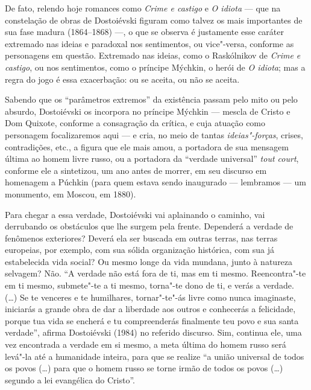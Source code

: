 De fato, relendo hoje romances como \emph{Crime e castigo}
e \emph{O idiota} --- que na constelação de
obras de Dostoiévski figuram como talvez os mais importantes
de sua fase madura (1864--1868) ---, o que se observa é
justamente esse caráter extremado nas ideias e paradoxal
nos sentimentos, ou vice"-versa, conforme as personagens em
questão. Extremado nas ideias, como o Raskólnikov de
\emph{Crime e castigo}, ou nos sentimentos, como o príncipe
Mýchkin, o herói de \emph{O idiota}; mas a regra do jogo é essa
exacerbação: ou se aceita, ou não se aceita. 

Sabendo que os ``parâmetros
extremos'' da existência passam pelo mito ou pelo absurdo, Dostoiévski
os incorpora no príncipe Mýchkin --- mescla de Cristo e Dom Quixote,
conforme a consagração da crítica, e cuja atuação como personagem
focalizaremos aqui --- e cria, no meio de tantas \emph{ideias"-forças},
crises, contradições, etc., a figura que ele mais amou,
a portadora de sua mensagem última ao homem livre russo, ou
a portadora da ``verdade universal'' \emph{tout court},
conforme ele a sintetizou, um ano antes de morrer, em seu
discurso em homenagem a Púchkin (para quem estava sendo
inaugurado --- lembramos --- um monumento, em Moscou, em 1880).

Para chegar a essa verdade, Dostoiévski vai aplainando o caminho,
vai derrubando os obstáculos que lhe surgem pela frente. Dependerá
a verdade de fenômenos exteriores? Deverá ela ser buscada em
outras terras, nas terras europeias, por exemplo, com sua
sólida organização histórica, com sua já estabelecida vida
social? Ou mesmo longe da vida mundana, junto à natureza
selvagem? Não. ``A verdade não está fora de ti, mas em ti
mesmo. Reencontra"-te em ti mesmo, submete"-te a ti mesmo,
torna"-te dono de ti, e verás a verdade. (\ldots{}) Se te
venceres e te humilhares, tornar"-te"-ás livre como nunca
imaginaste, iniciarás a grande obra de dar a liberdade aos
outros e conhecerás a felicidade, porque tua vida se
encherá e tu compreenderás finalmente teu povo e sua santa
verdade'', afirma Dostoiévski (1984) no referido discurso. Sim, continua ele, uma vez encontrada a verdade em si mesmo, a meta última do homem russo será levá"-la até a
humanidade inteira, para que se realize ``a união universal de
todos os povos (\ldots{}) para que o homem
russo se torne irmão de todos os povos (\ldots{}) segundo a lei
evangélica do Cristo''.

